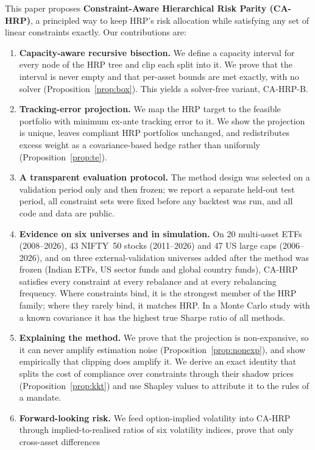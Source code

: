 This paper proposes \textbf{Constraint-Aware Hierarchical Risk Parity (CA-HRP)}, a
principled way to keep HRP's risk allocation while satisfying any set of linear
constraints exactly. Our contributions are:
\begin{enumerate}
\item \textbf{Capacity-aware recursive bisection.} We define a capacity interval for every
node of the HRP tree and clip each split into it. We prove that the interval is never
empty and that per-asset bounds are met exactly, with no solver
(Proposition~\ref{prop:box}). This yields a solver-free variant, CA-HRP-B.
\item \textbf{Tracking-error projection.} We map the HRP target to the feasible portfolio
with minimum ex-ante tracking error to it. We show the projection is unique, leaves
compliant HRP portfolios unchanged, and redistributes excess weight as a covariance-based
hedge rather than uniformly (Proposition~\ref{prop:te}).
\item \textbf{A transparent evaluation protocol.} The method design was selected on a
validation period only and then frozen; we report a separate held-out test period, all
constraint sets were fixed before any backtest was run, and all code and data are public.
\item \textbf{Evidence on six universes and in simulation.} On 20 multi-asset ETFs
(2008--2026), 43 NIFTY~50 stocks (2011--2026) and 47 US large caps (2006--2026), and on three
external-validation universes added after the method was frozen (Indian ETFs, US sector
funds and global country funds), CA-HRP satisfies every constraint at every rebalance and at
every rebalancing frequency. Where constraints bind, it is the strongest member of the HRP
family; where they rarely bind, it matches HRP. In a Monte Carlo study with a known
covariance it has the highest true Sharpe ratio of all methods.
\item \textbf{Explaining the method.} We prove that the projection is non-expansive, so it
can never amplify estimation noise (Proposition~\ref{prop:nonexp}), and show empirically that
clipping does amplify it. We derive an exact identity that splits the cost of compliance over
constraints through their shadow prices (Proposition~\ref{prop:kkt}) and use Shapley values
to attribute it to the rules of a mandate.
\item \textbf{Forward-looking risk.} We feed option-implied volatility into CA-HRP through
implied-to-realised ratios of six volatility indices, prove that only cross-asset differences

\end{enumerate}
